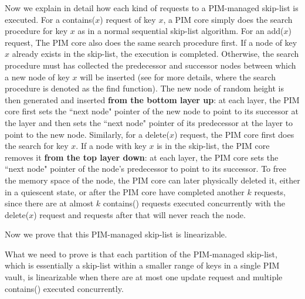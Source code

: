 \documentclass[11pt]{article}
\begin{document}
Now we explain in detail how each kind of requests to a PIM-managed skip-list is executed. 
For a contains($x$) request of key $x$, a PIM core simply does the search procedure for key $x$
as in a normal sequential skip-list algorithm. 
For an add($x$) request, The PIM core also does the same search procedure first. 
If a node of key $x$ already exists in the skip-list, the execution is completed.
Otherwise, the search procedure must has collected the predecessor and successor nodes 
between which a new node of key $x$ will be inserted 
(see \cite{Herlihy08} for more details, where the search procedure is denoted as the find function). 
The new node of random height is then generated and inserted \textbf{from the bottom layer up}: at each layer, 
the PIM core first sets the ``next node" pointer of the new node to point to its successor at the layer 
and then sets the ``next node" pointer of its predecessor at the layer to point to the new node. 
Similarly, for a delete($x$) request, the PIM core first does the search for key $x$. 
If a node with key $x$ is in the skip-list, the PIM core removes it \textbf{from the top layer down}: 
at each layer, the PIM core sets the ``next node" pointer of the node's predecessor to point to its successor.
To free the memory space of the node, the PIM core can later physically deleted it, either in a quiescent 
state, or after the PIM core have completed another $k$ requests, since there are at almost $k$ contains() 
requests executed concurrently with the delete($x$) request and requests after that will never reach the node. 

Now we prove that this PIM-managed skip-list is linearizable. 

\proof
What we need to prove is that each partition of the PIM-managed skip-list, 
which is essentially a skip-list within a smaller range of keys in a single PIM vault, 
is linearizable when there are at most one update request and multiple contains() executed concurrently.   
\end{document}
